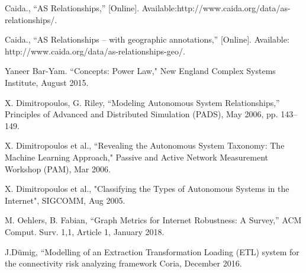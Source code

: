 \documentclass[conference, 11pt]{IEEEtran}
\begin{document}
\begin{thebibliography}{00}
Caida., ``AS Relationships,'' [Online]. Available:http://www.caida.org/data/as-relationships/.

Caida., ``AS Relationships -- with geographic annotations,'' [Online]. Available: http://www.caida.org/data/as-relationships-geo/.



 Yaneer Bar-Yam. ``Concepts: Power Law," New England Complex Systems Institute, August 2015.

X. Dimitropoulos, G. Riley, ``Modeling Autonomous System Relationships,'' Principles of Advanced and Distributed Simulation (PADS), May 2006, pp. 143--149.

X. Dimitropoulos et al., ``Revealing the Autonomous System Taxonomy: The Machine Learning Approach," Passive and Active Network Measurement Workshop (PAM), Mar 2006.

X. Dimitropoulos et al., "Classifying the Types of Autonomous Systems in the Internet", SIGCOMM, Aug 2005.


M. Oehlers, B. Fabian, ``Graph Metrics for Internet Robustness: A Survey,'' ACM Comput. Surv. 1,1, Article 1, January 2018.

J.Dümig, ``Modelling of an Extraction Transformation Loading (ETL) system for the connectivity risk analyzing framework Coria, December 2016.


\end{thebibliography}
\end{document}
